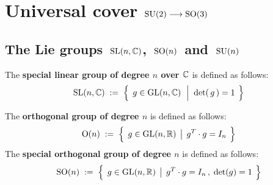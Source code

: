 

\chapter{Universal cover $\textnormal{SU}(2) \longrightarrow \textnormal{SO}(3)$}

\setcounter{theorem}{0}
\setcounter{equation}{0}


\renewcommand{\theenumi}{\roman{enumi}}
\renewcommand{\labelenumi}{\textnormal{(\theenumi)}$\;\;$}


\section{The Lie groups  \,$\textnormal{SL}(n,\mathbb{C})$,\, $\textnormal{SO}(n)$\, and \,$\textnormal{SU}(n)$}


\vskip 0.3cm
\begin{definition}
\mbox{}
\vskip 0.1cm
\noindent
The \textbf{special linear group of degree $n$ over $\mathbb{C}$} is defined as follows:
\begin{equation*}
\SL(n,\C)
\; := \;
	\left\{\;\,
		g \overset{{\color{white}.}}{\in} \textnormal{GL}(n,\C)
		\;\,\left\vert\;\;
			\det(\,g\,) \overset{{\color{white}1}}{=} 1
			\right.
		\;\right\}
\end{equation*}
\end{definition}

\vskip 0.5cm
\begin{definition}
\mbox{}
\vskip 0.1cm
\noindent
The \textbf{orthogonal group of degree $n$} is defined as follows:
\begin{equation*}
\textnormal{O}(n)
\; := \;
	\left\{\;\,
		g \overset{{\color{white}.}}{\in} \textnormal{GL}(n,\Re)
		\;\left\vert\;\,
			g^{T} \cdot g = I_{n}
			\right.
		\;\right\}
\end{equation*}
The \textbf{special orthogonal group of degree $n$} is defined as follows:
\begin{equation*}
\textnormal{SO}(n)
\; := \;
	\left\{\;\,
		g \overset{{\color{white}.}}{\in} \textnormal{GL}(n,\Re)
		\;\left\vert\;\,
			g^{T} \cdot g = I_{n}\,,
			\;
			\textnormal{det}(g) = 1
			\right.
		\;\right\}
\end{equation*}
\end{definition}

